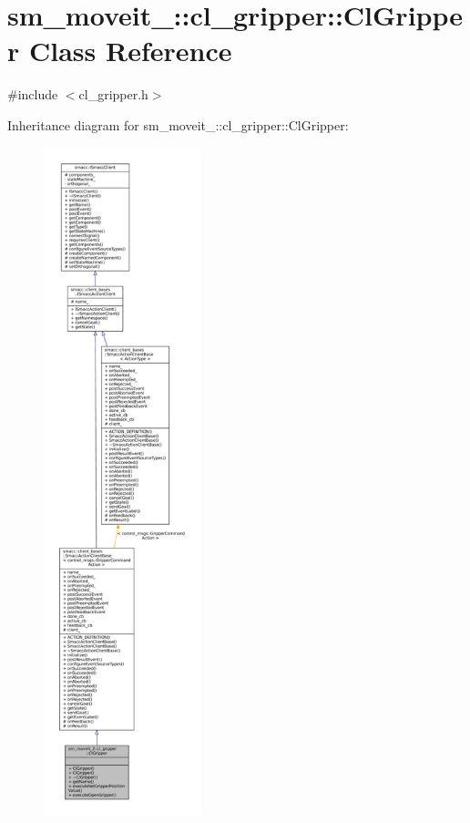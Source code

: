 \hypertarget{classsm__moveit__2_1_1cl__gripper_1_1ClGripper}{}\section{sm\+\_\+moveit\+\_\+:\+:cl\+\_\+gripper\+:\+:Cl\+Gripper Class Reference}
\label{classsm__moveit__2_1_1cl__gripper_1_1ClGripper}


{\ttfamily \#include $<$cl\+\_\+gripper.\+h$>$}



Inheritance diagram for sm\+\_\+moveit\+\_\+:\+:cl\+\_\+gripper\+:\+:Cl\+Gripper\+:
\nopagebreak
\begin{figure}[H]
\begin{center}
\leavevmode
\includegraphics[height=550pt]{classsm__moveit__2_1_1cl__gripper_1_1ClGripper__inherit__graph}
\end{center}
\end{figure}


